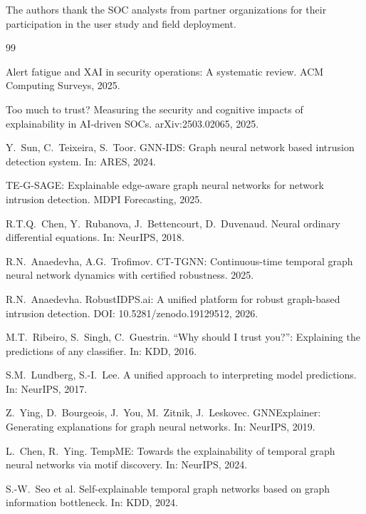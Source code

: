 \documentclass[preprint,review,12pt]{elsarticle}
\begin{document}
The authors thank the SOC analysts from partner organizations for their participation in the user study and field deployment.


\begin{thebibliography}{99}

 Alert fatigue and XAI in security operations: A systematic review. ACM Computing Surveys, 2025.

 Too much to trust? Measuring the security and cognitive impacts of explainability in AI-driven SOCs. arXiv:2503.02065, 2025.

 Y.~Sun, C.~Teixeira, S.~Toor. GNN-IDS: Graph neural network based intrusion detection system. In: ARES, 2024.

 TE-G-SAGE: Explainable edge-aware graph neural networks for network intrusion detection. MDPI Forecasting, 2025.

 R.T.Q.~Chen, Y.~Rubanova, J.~Bettencourt, D.~Duvenaud. Neural ordinary differential equations. In: NeurIPS, 2018.

 R.N.~Anaedevha, A.G.~Trofimov. CT-TGNN: Continuous-time temporal graph neural network dynamics with certified robustness. 2025.

 R.N.~Anaedevha. RobustIDPS.ai: A unified platform for robust graph-based intrusion detection. DOI: 10.5281/zenodo.19129512, 2026.

 M.T.~Ribeiro, S.~Singh, C.~Guestrin. ``Why should I trust you?'': Explaining the predictions of any classifier. In: KDD, 2016.

 S.M.~Lundberg, S.-I.~Lee. A unified approach to interpreting model predictions. In: NeurIPS, 2017.

 Z.~Ying, D.~Bourgeois, J.~You, M.~Zitnik, J.~Leskovec. GNNExplainer: Generating explanations for graph neural networks. In: NeurIPS, 2019.

 L.~Chen, R.~Ying. TempME: Towards the explainability of temporal graph neural networks via motif discovery. In: NeurIPS, 2024.

 S.-W.~Seo et al. Self-explainable temporal graph networks based on graph information bottleneck. In: KDD, 2024.


\end{thebibliography}
\end{document}
